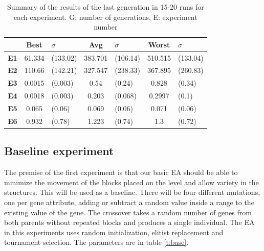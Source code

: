 \documentclass[sigconf]{acmart}
\newcommand{\myfloatalign}{\centering} %
\begin{document}
\begin{table}
	\myfloatalign
	\begin{tabular}{cclclcl}
		& \textbf{Best}& $\sigma$  &\textbf{Avg}&$\sigma$  & 
		\textbf{Worst}&$\sigma$ \\ \hline
		\textbf{E1}&61.334&(133.02)&383.701&(106.14)&510.515&(133.04)\\  \hline
		\textbf{E2}&110.66&(142.21)&327.547&(238.33)&367.895&(260.83)  \\  
		\hline
		\textbf{E3}&0.0015&(0.003)&0.54&(0.24)&0.828&(0.34)   \\  \hline
		\textbf{E4}&0.0018&(0.003)&0.203&(0.068)&0.2997&(0.1)  \\  \hline
		\textbf{E5}& 0.065&(0.06)&0.069&(0.06)&0.071&(0.06)     \\  \hline 
		\textbf{E6}& 0.932&(0.78)&1.223&(0.74)&1.3&(0.72) \\  \hline
		\hline
	\end{tabular}
	\caption{Summary of the results of the last generation in 15-20 runs for 
	each
		experiment.
		G: number of generations, E: experiment 
		number} %
	\label{t:resOver2}
\end{table}

\subsection{Baseline experiment}\label{E1}

The premise of the first experiment is that our basic EA should be able to 
minimize the movement of the blocks placed on the level and
allow variety in the structures. This will
be used as a baseline.
There will be four different mutations, one per gene attribute, adding or subtract a random value inside a range to the existing value of the gene.
The crossover takes a random number of genes from both parents
without repeated blocks and produces a single individual.
The EA in this experiments uses random initialization, elitist replacement and tournament selection. The parameters are in table \ref{t:base}.
\end{document}

